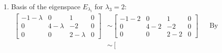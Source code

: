 \documentclass[10pt,letterpaper,final]{report}
\newcommand{\reason}[1]{&& \text{#1}}
\begin{document}
\begin{enumerate}[label=(\alph*)]
\begin{enumerate}[label=(\arabic*)]
\begin{align*}
\begin{bmatrix}
                                                         0 \\
                                                       \end{bmatrix}
                \end{align*}
                Hence the basis for the eigenspace $E_{\lambda_i}$ corresponding to $\lambda_2 = 4$ is $\left\{\begin{bmatrix}0\\1\\0\end{bmatrix}\right\}$.
                \begin{figure}[H]
                  \centering
                  \caption{{Basis for the eigenspace $E_{\lambda_i}$ corresponding to $\lambda_2 = 4$}}
                \end{figure}
                \pagebreak
          \item Basis of the eigenspace $E_{\lambda_i}$ for $\lambda_3 = 2$:
                \begin{align*}
                  \left[\begin{array}{rrr|r}
                      -1 - \lambda & 0           & 1           & 0 \\
                      0            & 4 - \lambda & -2          & 0 \\
                      0            & 0           & 2 - \lambda & 0
                    \end{array}\right] & \sim \left[\begin{array}{rrr|r}
                                                  -1 - 2 & 0     & 1     & 0 \\
                                                  0      & 4 - 2 & -2    & 0 \\
                                                  0      & 0     & 2 - 2 & 0
                                                \end{array}\right] \reason{By substitution}                                           \\[1ex]
                                                                      & \sim \left[\begin{array}{rrr|r}

\end{array}
\end{align*}
\end{enumerate}
\end{enumerate}
\end{document}
